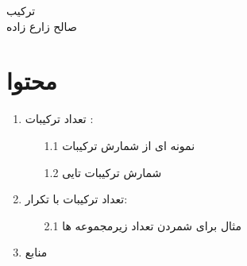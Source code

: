 \documentclass[12pt]{article}
\begin{document}
\begin{center}
{\Huge ترکیب}\\
\vspace{3mm}
{\large صالح زارع زاده}
\end{center}
\section*{محتوا}
\begin{enumerate}
\item{تعداد ترکیبات   :
\begin{itemize}
\item[1.1]{نمونه ای از شمارش ترکیبات}
\item[1.2]{شمارش ترکیبات تایی}
\end{itemize}
}
\item{تعداد ترکیبات با تکرار:
\begin{itemize}
\item[2.1]{مثال برای شمردن تعداد زیرمجموعه ها}
\end{itemize}
}
\item{منابع}
\end{enumerate}
\end{document}
